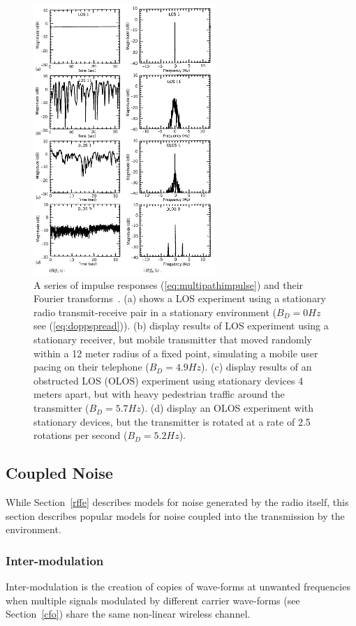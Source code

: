 \FloatBarrier
\begin{figure}[ht!]
	\centering	\includegraphics[width=0.615\textwidth,keepaspectratio]{figs/dopplers.png}
    \caption{A series of impulse responses (\ref{eq:multipathimpulse}) and their Fourier transforms~\cite{pahlavan2005wireless}. (a) shows a LOS experiment using a stationary radio transmit-receive pair in a stationary environment ($B_D=0 Hz$ see (\ref{eq:doppspread})). (b) display results of LOS experiment using a stationary receiver, but mobile transmitter that moved randomly within a 12 meter radius of a fixed point, simulating a mobile user pacing on their telephone ($B_D=4.9 Hz$). (c) display results of an obstructed LOS (OLOS) experiment using stationary devices 4 meters apart, but with heavy pedestrian traffic around the transmitter ($B_D=5.7 Hz$). (d) display an OLOS experiment with stationary devices, but the transmitter is rotated at a rate of 2.5 rotations per second ($B_D=5.2 Hz$).}
\label{fig:dopplers} 
\end{figure}
\FloatBarrier

\subsection{Coupled Noise}
While Section~\ref{rffe} describes models for noise generated by the radio itself, this section describes popular models for noise coupled into the transmission by the environment. 
\subsubsection{Inter-modulation}
Inter-modulation is the creation of copies of wave-forms at unwanted frequencies when multiple signals modulated by different carrier wave-forms (see Section~\ref{cfo}) share the same non-linear wireless channel.
